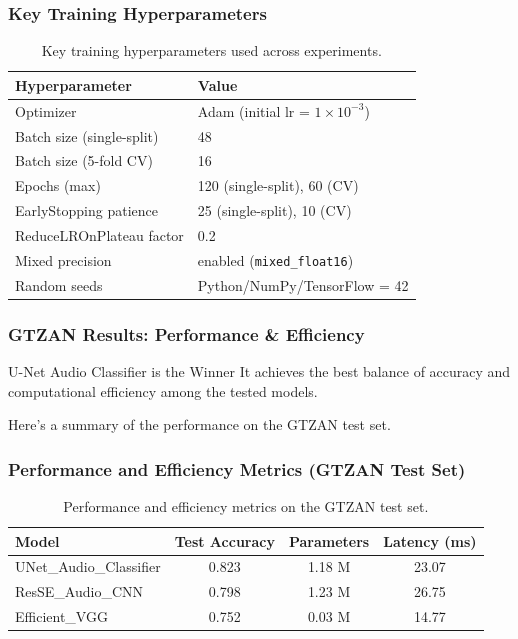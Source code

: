 \documentclass{beamer}
\begin{document}
\begin{frame}[plain]
    \frametitle{Key Training Hyperparameters}

\begin{table}
\centering
\caption{Key training hyperparameters used across experiments.}
\begin{tabular}{ll}
\toprule
\textbf{Hyperparameter} & \textbf{Value} \\
\midrule
Optimizer & Adam (initial lr = $1 \times 10^{-3}$) \\
Batch size (single-split) & 48 \\
Batch size (5-fold CV) & 16 \\
Epochs (max) & 120 (single-split), 60 (CV) \\
EarlyStopping patience & 25 (single-split), 10 (CV) \\
ReduceLROnPlateau factor & 0.2 \\
Mixed precision & enabled (\texttt{mixed\_float16}) \\
Random seeds & Python/NumPy/TensorFlow = 42 \\
\bottomrule
\end{tabular}
\end{table}
\end{frame}

\begin{frame}
    \frametitle{GTZAN Results: Performance \& Efficiency}
    \begin{block}{U-Net Audio Classifier is the Winner}
        It achieves the best balance of accuracy and computational efficiency among the tested models.
    \end{block}
    Here's a summary of the performance on the GTZAN test set.
\end{frame}

\begin{frame}[plain]
    \frametitle{Performance and Efficiency Metrics (GTZAN Test Set)}

\begin{table}
\centering
\caption{Performance and efficiency metrics on the GTZAN test set.}
\begin{tabular}{lccc}
\toprule
\textbf{Model} & \textbf{Test Accuracy} & \textbf{Parameters} & \textbf{Latency (ms)} \\
\midrule
UNet\_Audio\_Classifier & 0.823 & 1.18 M & 23.07 \\
ResSE\_Audio\_CNN & 0.798 & 1.23 M & 26.75 \\
Efficient\_VGG & 0.752 & 0.03 M & 14.77 \\
\bottomrule
\end{tabular}
\end{table}
\end{frame}
\end{document}
